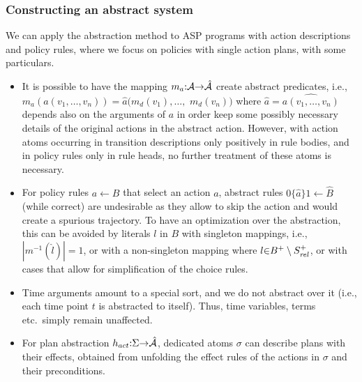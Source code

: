 \documentclass{new_tlp}
\def\mi#1{\mathit{#1\/}}
\begin{document}
\subsubsection{Constructing an abstract system}
We can apply the abstraction method to ASP programs 
with action
descriptions and policy rules, where we focus on 
policies with single action plans, 
with some particulars.

\begin{itemize}
 \item %
 It is possible to have
the mapping $m_a{:}{\cal A}{\rightarrow} \hat{\cal A}$ %
create abstract
predicates, i.e., $m_a(a(v_1,\dots,v_n))=\hat{a}(m_{d}(v_1),\dots,$
$m_{d}(v_n))$ where $\hat{a} = \widehat{a(v_1,\dots,v_n)}$ depends also on the arguments of $a$ in order keep some possibly necessary details of the original actions in the abstract action.  However, with action atoms occurring in transition descriptions
only positively in rule bodies, and in policy rules only in rule
heads, no further treatment of these atoms is necessary.

\item For policy rules 
$a {\leftarrow} B$ that select an action $a$, abstract rules
$0\{\hat{a}\}1 {\leftarrow} \widehat{B}$ 
(while correct) are undesirable as they allow to skip the action and would create a spurious trajectory. %
To have an optimization over the abstraction, 
this can be avoided by
literals $l$ in %
$B$ with singleton mappings, i.e.,
$|m^{-1}(\hat{l})|{=}1$, or with a non-singleton mapping
where $l {\in} B^{+}\setminus S^+_{\mi{rel}}$, or with cases 
that allow for simplification of the choice rules. %

\item Time arguments amount to a special sort, and we do not abstract
over it (i.e., each time point $t$ is abstracted to itself).
Thus, time variables, terms etc.\ simply remain unaffected.

\item For plan abstraction
$h_{act}{:} \Sigma {\rightarrow} \hat{\cal A}$, dedicated atoms
$\sigma$ can describe plans with their effects, obtained 
from unfolding %
the 
effect rules of the actions in $\sigma$ %
and their preconditions.
\end{itemize}
\end{document}
